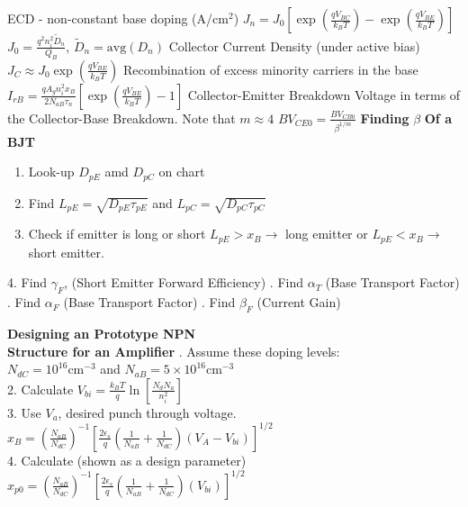 \begin{multicols}{3}
ECD - non-constant base doping   (A/$\text{cm}^2$) \hfill \break 
$J_n= J_0\left[\exp\left(\frac{qV_{BC}}{k_BT}\right)-\exp\left(\frac{qV_{BE}}{k_BT}\right)\right]$ \hfill \break 
$J_0= \frac{q^2n_i^2 \tilde{D}_n}{Q_B}$, $\tilde{D}_n= \text{avg}(D_n)$  \hfill \break 
%
%
Collector Current Density (under active bias)  \hfill \break  
$J_C \approx J_0 \exp\left(\frac{qV_{BE}}{k_BT}\right)$  \hfill \break  
%
%
Recombination of excess minority carriers in the base  \hfill \break
$I_{rB}=\frac{qA_gn_i^2x_B}{2N_{aB}\tau_n}\left[\exp\left(\frac{qV_{BE}}{k_BT}\right)-1\right]$  \hfill \break
%
%
Collector-Emitter Breakdown Voltage  in terms of the Collector-Base
Breakdown. Note that $m \approx 4$ \hfill \break
$BV_{CE0}=\frac{BV_{CB0}}{\beta^{1/m}}$ \hfill 
  \textbf{Finding}  $\beta$ \textbf{Of a BJT}
  \begin{enumerate}
  \item  Look-up $D_{pE}$ amd $D_{pC}$ on chart
  \item  Find $L_{pE}=\sqrt{D_{pE}\tau_{pE}}$ and $L_{pC}=\sqrt{D_{pC}\tau_{pC}}$ 
  \item  Check if emitter is long or short $L_{pE}>x_B \rightarrow $ long emitter or $L_{pE}<x_B \rightarrow$ short emitter.
  \end{enumerate}
\begin{flushright}
   4. Find $\gamma_F$, (Short Emitter Forward Efficiency) .  Find $\alpha_T$ (Base Transport Factor)            .  Find $\alpha_F$ (Base Transport Factor)            .  Find $\beta_F$  (Current Gain)                    
\end{flushright}
\vspace*{-0.75cm}
\begin{flushright}
\textbf{Designing an Prototype NPN  \\ Structure for an Amplifier} . Assume these doping levels: \\ $N_{dC}=10^{16} \text{cm}^{-3}$ 
and $N_{aB}=5 \times 10^{16} \text{cm}^{-3}$ \\
2. Calculate $V_{bi}=\frac{k_BT}{q} \ln \left[\frac{N_dN_a}{n_i^2}\right]$ \\
3. Use $V_a$, desired punch through voltage. $x_B= \left(\frac{N_{aB}}{N_{dC}}\right)^{-1}\left[\frac{2\epsilon_s}{q}\left(\frac{1}{N_{aB}}+\frac{1}{N_{dC}}\right)(V_A-V_{bi})\right]^{1/2}$ \\
4. Calculate (shown as a design parameter) $x_{p0}=\left(\frac{N_{aB}}{N_{dC}}\right)^{-1}\left[\frac{2\epsilon_s}{q}\left(\frac{1}{N_{aB}}+\frac{1}{N_{dC}}\right)(V_{bi})\right]^{1/2}$ \\

\end{flushright}
\end{multicols}
